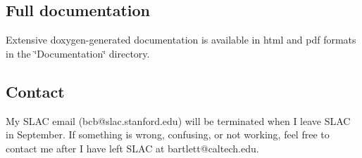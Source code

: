 \subsection*{Full documentation}

Extensive doxygen-\/generated documentation is available in html and pdf formats in the \char`\"{}\+Documentation\char`\"{} directory.

\subsection*{Contact}

My S\+L\+AC email ({\ttfamily bcb@slac.\+stanford.\+edu}) will be terminated when I leave S\+L\+AC in September. If something is wrong, confusing, or not working, feel free to contact me after I have left S\+L\+AC at {\ttfamily bartlett@caltech.\+edu}. 